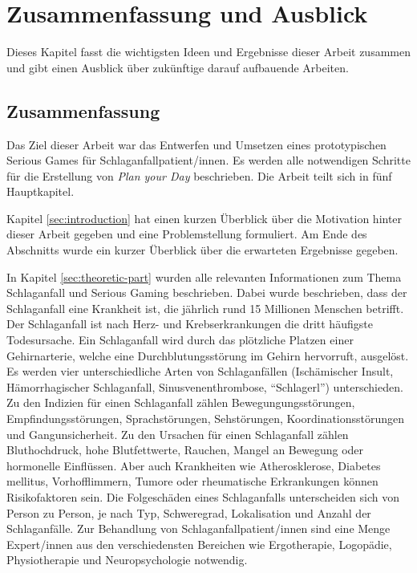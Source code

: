 \chapter{Zusammenfassung und Ausblick}
\label{sec:conclusion}
Dieses Kapitel fasst die wichtigsten Ideen und Ergebnisse dieser Arbeit zusammen und gibt einen Ausblick über zukünftige darauf aufbauende Arbeiten.

\section{Zusammenfassung}
Das Ziel dieser Arbeit war das Entwerfen und Umsetzen eines prototypischen Serious Games für Schlaganfallpatient/innen. Es werden alle notwendigen Schritte für die Erstellung von \textit{Plan your Day} beschrieben. Die Arbeit teilt sich in fünf Hauptkapitel.

Kapitel \ref{sec:introduction} hat einen kurzen Überblick über die Motivation hinter dieser Arbeit gegeben und eine Problemstellung formuliert. Am Ende des Abschnitts wurde ein kurzer Überblick über die erwarteten Ergebnisse gegeben.

In Kapitel \ref{sec:theoretic-part} wurden alle relevanten Informationen zum Thema Schlaganfall und Serious Gaming beschrieben. Dabei wurde beschrieben, dass der Schlaganfall eine Krankheit ist, die jährlich rund 15 Millionen Menschen betrifft. Der Schlaganfall ist nach Herz- und Krebserkrankungen die dritt häufigste Todesursache. Ein Schlaganfall wird durch das plötzliche Platzen einer Gehirnarterie, welche eine Durchblutungsstörung im Gehirn hervorruft, ausgelöst. Es werden vier unterschiedliche Arten von Schlaganfällen (Ischämischer Insult, Hämorrhagischer Schlaganfall, Sinusvenenthrombose, \enquote{Schlagerl}) unterschieden. Zu den Indizien für einen Schlaganfall zählen Bewegungungsstörungen, Empfindungsstörungen, Sprachstörungen, Sehstörungen, Koordinationsstörungen und Gangunsicherheit. Zu den Ursachen für einen Schlaganfall zählen Bluthochdruck, hohe Blutfettwerte, Rauchen, Mangel an Bewegung oder hormonelle Einflüssen. Aber auch Krankheiten wie Atherosklerose, Diabetes mellitus, Vorhofflimmern, Tumore oder rheumatische Erkrankungen können Risikofaktoren sein. Die Folgeschäden eines Schlaganfalls unterscheiden sich von Person zu Person, je nach Typ, Schweregrad, Lokalisation und Anzahl der Schlaganfälle. Zur Behandlung von Schlaganfallpatient/innen sind eine Menge Expert/innen aus den verschiedensten Bereichen wie Ergotherapie, Logopädie, Physiotherapie und Neuropsychologie notwendig.

